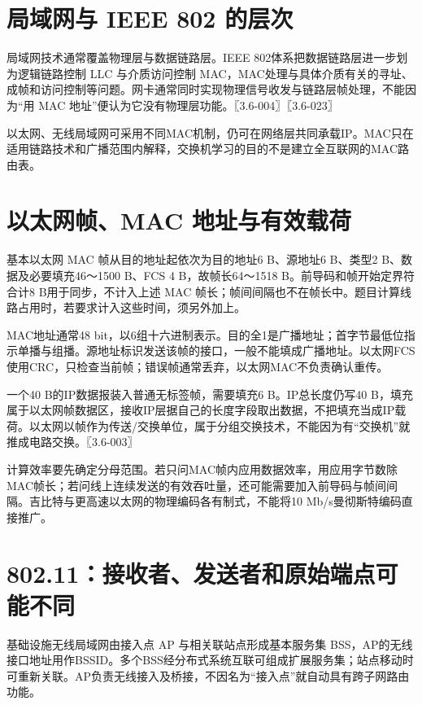 \section{局域网与 IEEE 802 的层次}\label{cn-03-14}

局域网技术通常覆盖物理层与数据链路层。IEEE 802体系把数据链路层进一步划为逻辑链路控制 LLC 与介质访问控制 MAC，MAC处理与具体介质有关的寻址、成帧和访问控制等问题。网卡通常同时实现物理信号收发与链路层帧处理，不能因为``用 MAC 地址''便认为它没有物理层功能。〖3.6-004〗〖3.6-023〗

以太网、无线局域网可采用不同MAC机制，仍可在网络层共同承载IP。MAC只在适用链路技术和广播范围内解释，交换机学习的目的不是建立全互联网的MAC路由表。

\section{以太网帧、MAC 地址与有效载荷}\label{cn-03-15}

基本以太网 MAC 帧从目的地址起依次为目的地址6 B、源地址6 B、类型2 B、数据及必要填充46～1500 B、FCS 4 B，故帧长64～1518 B。前导码和帧开始定界符合计8 B用于同步，不计入上述 MAC 帧长；帧间间隔也不在帧长中。题目计算线路占用时，若要求计入这些时间，须另外加上。

MAC地址通常48 bit，以6组十六进制表示。目的全1是广播地址；首字节最低位指示单播与组播。源地址标识发送该帧的接口，一般不能填成广播地址。以太网FCS使用CRC，只检查当前帧；错误帧通常丢弃，以太网MAC不负责确认重传。

一个40 B的IP数据报装入普通无标签帧，需要填充6 B。IP总长度仍写40 B，填充属于以太网帧数据区，接收IP层据自己的长度字段取出数据，不把填充当成IP载荷。以太网以帧作为传送/交换单位，属于分组交换技术，不能因为有``交换机''就推成电路交换。〖3.6-003〗

计算效率要先确定分母范围。若只问MAC帧内应用数据效率，用应用字节数除MAC帧长；若问线上连续发送的有效吞吐量，还可能需要加入前导码与帧间间隔。吉比特与更高速以太网的物理编码各有制式，不能将10 Mb/s曼彻斯特编码直接推广。

\section{802.11：接收者、发送者和原始端点可能不同}\label{cn-03-16}

基础设施无线局域网由接入点 AP 与相关联站点形成基本服务集 BSS，AP的无线接口地址用作BSSID。多个BSS经分布式系统互联可组成扩展服务集；站点移动时可重新关联。AP负责无线接入及桥接，不因名为``接入点''就自动具有跨子网路由功能。

